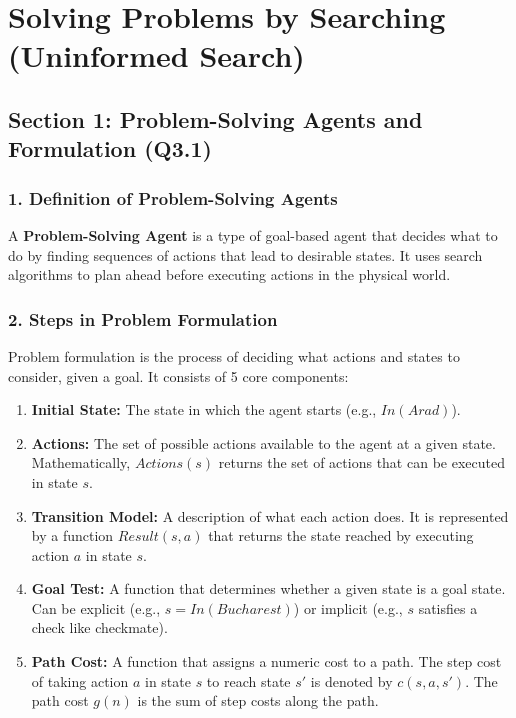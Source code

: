 \chapter{Solving Problems by Searching (Uninformed Search)}



\section{Section 1: Problem-Solving Agents and Formulation (Q3.1)}

\subsection{1. Definition of Problem-Solving Agents}
A \textbf{Problem-Solving Agent} is a type of goal-based agent that decides what to do by finding sequences of actions that lead to desirable states. It uses search algorithms to plan ahead before executing actions in the physical world.

\subsection{2. Steps in Problem Formulation}
Problem formulation is the process of deciding what actions and states to consider, given a goal. It consists of 5 core components:

\begin{enumerate}
  \item \textbf{Initial State:} The state in which the agent starts (e.g., $In(Arad)$).
  \item \textbf{Actions:} The set of possible actions available to the agent at a given state. Mathematically, $Actions(s)$ returns the set of actions that can be executed in state $s$.
  \item \textbf{Transition Model:} A description of what each action does. It is represented by a function $Result(s, a)$ that returns the state reached by executing action $a$ in state $s$.
  \item \textbf{Goal Test:} A function that determines whether a given state is a goal state. Can be explicit (e.g., $s = In(Bucharest)$) or implicit (e.g., $s$ satisfies a check like checkmate).
  \item \textbf{Path Cost:} A function that assigns a numeric cost to a path. The step cost of taking action $a$ in state $s$ to reach state $s'$ is denoted by $c(s, a, s')$. The path cost $g(n)$ is the sum of step costs along the path.
\end{enumerate}

